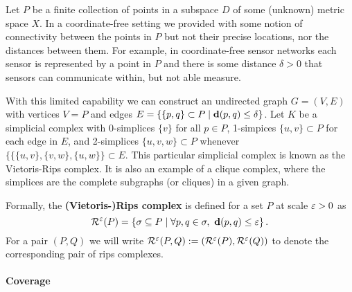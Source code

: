 Let $P$ be a finite collection of points in a subspace $D$ of some (unknown) metric space $X$.
In a coordinate-free setting we provided with some notion of connectivity between the points in $P$ but not their precise locations, nor the distances between them.
For example, in coordinate-free sensor networks each sensor is represented by a point in $P$ and there is some distance $\delta > 0$ that sensors can communicate within, but not able measure.

With this limited capability we can construct an undirected graph $G=(V, E)$ with vertices $V=P$ and edges $E = \{\{p, q\}\subset P\mid \mathbf{d}(p,q)\leq\delta\}$.
Let $K$ be a simplicial complex with 0-simplices $\{v\}$ for all $p\in P$, 1-simpices $\{u, v\}\subset P$ for each edge in $E$, and 2-simplices $\{u,v,w\}\subset P$ whenever $\{\{\{u,v\},\{v,w\},\{u,w\}\}\subset E$.
This particular simplicial complex is known as the Vietoris-Rips complex.
It is also an example of a clique complex, where the simplices are the complete subgraphs (or cliques) in a given graph.

Formally, the \textbf{(Vietoris-)Rips complex} is defined for a set $P$ at scale $\varepsilon > 0$ as
\[ \mathcal{R}^\varepsilon(P) = \left\{\sigma \subseteq P\mid \forall p,q\in\sigma,\ \mathbf{d}(p, q)\leq \varepsilon\right\}. \]
For a pair $(P, Q)$ we will write $\mathcal{R}^\varepsilon(P,Q) := (\mathcal{R}^\varepsilon(P), \mathcal{R}^\varepsilon(Q))$ to denote the corresponding pair of rips complexes.

\paragraph{Coverage}



